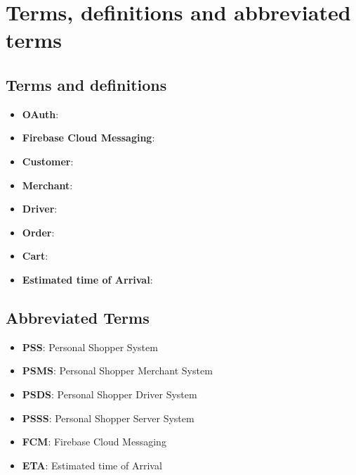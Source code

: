 \section{Terms, definitions and abbreviated terms}
\subsection{Terms and definitions}
\begin{itemize}
    \item \textbf{OAuth}:
    \item \textbf{Firebase Cloud Messaging}:
    \item \textbf{Customer}:
    \item \textbf{Merchant}:
    \item \textbf{Driver}:
    \item \textbf{Order}:
    \item \textbf{Cart}:
    \item \textbf{Estimated time of Arrival}:
\end{itemize}

\subsection{Abbreviated Terms}
\begin{itemize}
    \item \textbf{PSS}: Personal Shopper System
    \item \textbf{PSMS}: Personal Shopper Merchant System
    \item \textbf{PSDS}: Personal Shopper Driver System
    \item \textbf{PSSS}: Personal Shopper Server System
    \item \textbf{FCM}: Firebase Cloud Messaging
    \item \textbf{ETA}: Estimated time of Arrival
\end{itemize}

\pagebreak

